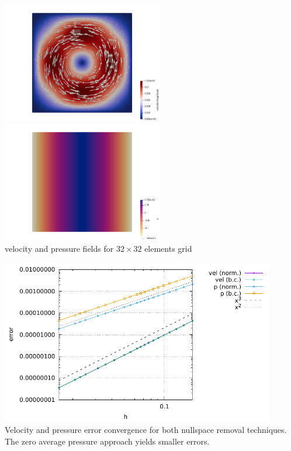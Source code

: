 \begin{center}
\includegraphics[width=7cm]{python_codes/fieldstone_18/results/mms/vel}
\includegraphics[width=7cm]{python_codes/fieldstone_18/results/mms/pressure}\\
{\captionfont velocity and pressure fields for $32\times 32$ elements grid}
\end{center}

\begin{center}
\includegraphics[width=12cm]{python_codes/fieldstone_18/results/mms/errors}\\
{\captionfont Velocity and pressure error convergence for both nullspace removal 
techniques. The zero average pressure approach yields smaller errors.}
\end{center}


